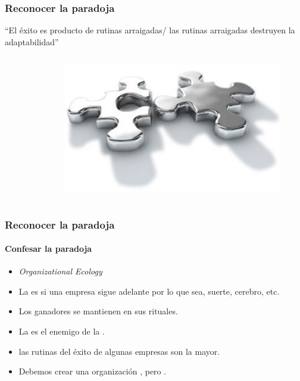 \frame
{
\frametitle{Reconocer la paradoja}
\vspace{1cm}
\begin{center}
	``El éxito es producto de rutinas arraigadas/
	las rutinas arraigadas destruyen la adaptabilidad''
\end{center}
\hspace{2cm}
\begin{columns}
\begin{column}{0.6\textwidth}
\end{column}
\begin{column}{0.4\textwidth}
	\includegraphics[width=0.9\textwidth]{img/adaptabilidad}
\end{column}
\end{columns}
}

\frame
{
\frametitle{Reconocer la paradoja}
\framesubtitle{Confesar la paradoja}
\begin{itemize}
	\item \emph{Organizational Ecology} %
	\item La  es si una empresa sigue adelante por lo que sea, suerte, cerebro, etc.
	\item Los ganadores se mantienen  en sus rituales.
	\item La  es el enemigo de la .
	\item {} las rutinas del éxito de algunas empresas son la  mayor.
	\item Debemos crear una organización , pero .
\end{itemize}
}

